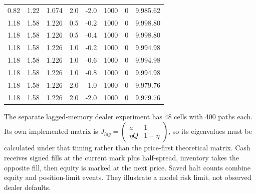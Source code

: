 \begin{table}[htbp]
{\begin{tabular}{lrrrrrrr}
0.82 & 1.22 & 1.074 & 2.0 & -2.0 & 1000 & 0 & 9,985.62 \\
1.18 & 1.58 & 1.226 & 0.5 & -0.2 & 1000 & 0 & 9,998.80 \\
1.18 & 1.58 & 1.226 & 0.5 & -0.4 & 1000 & 0 & 9,998.80 \\
1.18 & 1.58 & 1.226 & 1.0 & -0.2 & 1000 & 0 & 9,994.98 \\
1.18 & 1.58 & 1.226 & 1.0 & -0.6 & 1000 & 0 & 9,994.98 \\
1.18 & 1.58 & 1.226 & 1.0 & -0.8 & 1000 & 0 & 9,994.98 \\
1.18 & 1.58 & 1.226 & 2.0 & -1.0 & 1000 & 0 & 9,979.76 \\
1.18 & 1.58 & 1.226 & 2.0 & -2.0 & 1000 & 0 & 9,979.76 \\
\bottomrule\end{tabular}}
\end{table}

The separate lagged-memory dealer experiment has 48 cells with 400 paths each. Its own implemented matrix is $J_{lag}=\left(\begin{smallmatrix}a&1\\\eta Q&1-\eta\end{smallmatrix}\right)$, so its eigenvalues must be calculated under that timing rather than the price-first theoretical matrix. Cash receives signed fills at the current mark plus half-spread, inventory takes the opposite fill, then equity is marked at the next price. Saved halt counts combine equity and position-limit events. They illustrate a model risk limit, not observed dealer defaults.
\begin{table}[htbp]
\centering\footnotesize\setlength{\tabcolsep}{3pt}
\caption{Reproduced existing lagged-memory dealer simulations at leverage parameter 10. A halt occurs at nonpositive equity or the model position limit; these causes are not separated in the archived counts. B1/B2/B3 reuse saved model flow moments, not estimated real dealer fills. All 48 cells and exact binomial intervals remain available.}
\label{tab:dealer_drawdown_stats}
\end{table}

